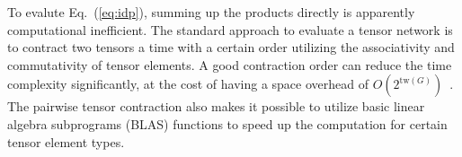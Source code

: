 \documentclass[onefignum, onetabnum]{siamart190516}
\newcommand{\<}{\langle}
\renewcommand{\>}{\rangle}
\newcommand{\Eq}[1]{Eq.~(\ref{#1})}
\begin{document}
To evalute \Eq{eq:idp}, summing up the products directly is apparently computational inefficient.
The standard approach to evaluate a tensor network is to contract two tensors a time with a certain order utilizing the associativity and commutativity of tensor elements.
A good contraction order can reduce the time complexity significantly, at the cost of having a space overhead of $O(2^{\text{tw}(G)})$~\cite{Markov2008}.
The pairwise tensor contraction also makes it possible to utilize basic linear algebra subprograms (BLAS) functions to speed up the computation for certain tensor element types.
\end{document}
